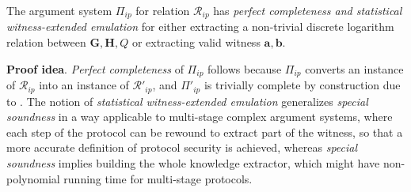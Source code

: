 \documentclass[../../book.tex]{subfiles}
\begin{document}
\begin{theorem}
    The argument system $\Pi_{ip}$ for relation $\mathcal{R}_{ip}$ has \textit{perfect completeness and statistical witness-extended emulation} for either extracting a non-trivial discrete logarithm relation between $\mathbf{G,H}, Q$ or extracting valid witness $\mathbf{a,b}$.
\end{theorem}

\textbf{Proof idea}. \textit{Perfect completeness} of $\Pi_{ip}$ follows because $\Pi_{ip}$ converts an instance of $\mathcal{R}_{ip}$ into an instance of $\mathcal{R}'_{ip}$, and $\Pi'_{ip}$ is trivially complete by construction due to . The notion of \textit{statistical witness-extended emulation} generalizes \textit{special soundness} in a way applicable to multi-stage complex argument systems, where each step of the protocol can be rewound to extract part of the witness, so that a more accurate definition of protocol security is achieved, whereas \textit{special soundness} implies building the whole knowledge extractor, which might have non-polynomial running time for multi-stage protocols.
\end{document}
